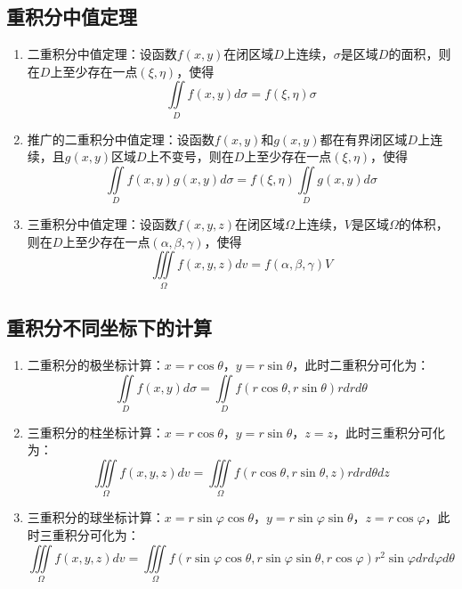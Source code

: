 \documentclass[12pt,a4paper,UTF8]{book}
\begin{document}
\subsection{重积分中值定理}
\begin{enumerate}
\item 二重积分中值定理：设函数$f\left(x,y\right)$在闭区域$D$上连续，$\sigma$是区域$D$的面积，则在$D$上至少存在一点$\left(\xi,\eta\right)$，使得
\[\iint\limits_{D}f\left(x,y\right)d\sigma=f\left(\xi,\eta\right)\sigma\]
\item 推广的二重积分中值定理：设函数$f\left(x,y\right)$和$g\left(x,y\right)$都在有界闭区域$D$上连续，且$g\left(x,y\right)$区域$D$上不变号，则在$D$上至少存在一点$\left(\xi,\eta\right)$，使得
\[\iint\limits_{D}f\left(x,y\right)g\left(x,y\right)d\sigma=f\left(\xi,\eta\right)\iint\limits_{D}g\left(x,y\right)d\sigma\]
\item 三重积分中值定理：设函数$f\left(x,y,z\right)$在闭区域$\Omega$上连续，$V$是区域$\Omega$的体积，则在$D$上至少存在一点$\left(\alpha,\beta,\gamma\right)$，使得
\[\iiint\limits_{\Omega}f\left(x,y,z\right)dv=f\left(\alpha,\beta,\gamma\right)V\]
\end{enumerate}

\subsection{重积分不同坐标下的计算}
\begin{enumerate}
\item 二重积分的极坐标计算：$x=r\cos\theta$，$y=r\sin\theta$，此时二重积分可化为：
\[\iint\limits_{D}f\left(x,y\right)d\sigma=\iint\limits_{D}f\left(r\cos\theta,r\sin\theta\right)rdrd\theta\]
\item 三重积分的柱坐标计算：$x=r\cos\theta$，$y=r\sin\theta$，$z=z$，此时三重积分可化为：
\[\iiint\limits_{\Omega}f\left(x,y,z\right)dv=\iiint\limits_{\Omega}f\left(r\cos\theta,r\sin\theta,z\right)rdrd\theta dz\]
\item 三重积分的球坐标计算：$x=r\sin\varphi\cos\theta$，$y=r\sin\varphi\sin\theta$，$z=r\cos\varphi$，此时三重积分可化为：
\[\iiint\limits_{\Omega}f\left(x,y,z\right)dv=\iiint\limits_{\Omega}f\left(r\sin\varphi\cos\theta,r\sin\varphi\sin\theta,r\cos\varphi\right)r^2\sin\varphi drd\varphi d\theta\]
\end{enumerate}
\end{document}
